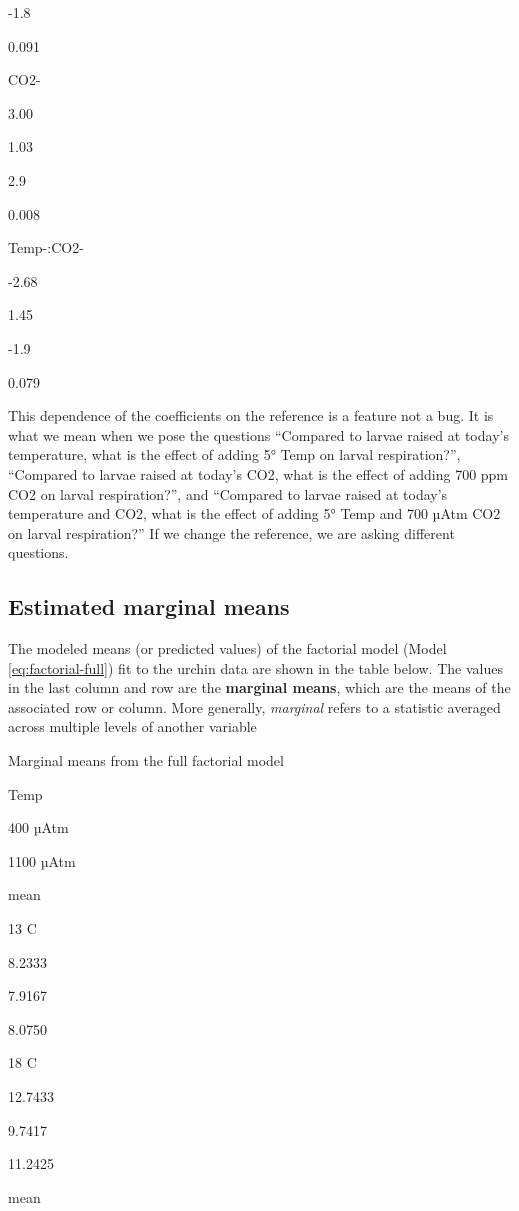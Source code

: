 \documentclass[]{book}
\begin{document}
-1.8

0.091

CO2-

3.00

1.03

2.9

0.008

Temp-:CO2-

-2.68

1.45

-1.9

0.079

This dependence of the coefficients on the reference is a feature not a bug. It is what we mean when we pose the questions ``Compared to larvae raised at today's temperature, what is the effect of adding 5° Temp on larval respiration?'', ``Compared to larvae raised at today's CO2, what is the effect of adding 700 ppm CO2 on larval respiration?'', and ``Compared to larvae raised at today's temperature and CO2, what is the effect of adding 5° Temp and 700 µAtm CO2 on larval respiration?'' If we change the reference, we are asking different questions.

\hypertarget{estimated-marginal-means}{%
\subsection{Estimated marginal means}\label{estimated-marginal-means}}

The modeled means (or predicted values) of the factorial model (Model \eqref{eq:factorial-full}) fit to the urchin data are shown in the table below. The values in the last column and row are the \textbf{marginal means}, which are the means of the associated row or column. More generally, \emph{marginal} refers to a statistic averaged across multiple levels of another variable

\label{tab:factorial-means}Marginal means from the full factorial model

Temp

400 µAtm

1100 µAtm

mean

13 C

8.2333

7.9167

8.0750

18 C

12.7433

9.7417

11.2425

mean
\end{document}
